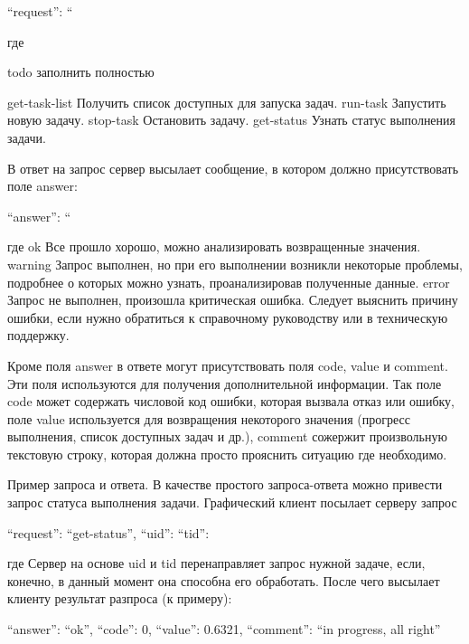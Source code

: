         { “request”: “%
        
где %

todo заполнить полностью

get-task-list
	Получить список доступных для запуска задач.
	run-task
	Запустить новую задачу.
	stop-task
	Остановить задачу.
	get-status
	Узнать статус выполнения задачи.
	
В ответ на запрос сервер высылает сообщение, в котором должно присутствовать поле answer:
	
        { “answer”: “%
        
где %
ok
	Все прошло хорошо, можно анализировать возвращенные значения.
	warning
	Запрос выполнен, но при его выполнении возникли некоторые проблемы, подробнее о которых можно узнать, проанализировав полученные данные.
	error
	Запрос не выполнен, произошла критическая ошибка. Следует выяснить причину ошибки, если нужно обратиться к справочному руководству или в техническую поддержку.
	
	Кроме поля answer в ответе могут присутствовать поля code, value и comment. Эти поля используются для получения дополнительной информации. Так поле code может содержать числовой код ошибки, которая вызвала отказ или ошибку, поле value используется для возвращения некоторого значения (прогресс выполнения, список доступных задач и др.), comment сожержит произвольную текстовую строку, которая должна просто прояснить ситуацию где необходимо.
	
Пример запроса и ответа. В качестве простого запроса-ответа можно привести запрос статуса выполнения задачи. Графический клиент посылает серверу запрос

        {
“request”: “get-status”,
“uid”: %
“tid”: %
}

где %
Сервер на основе uid и tid перенаправляет запрос нужной задаче, если, конечно, в данный момент она способна его обработать. После чего высылает клиенту результат разпроса (к примеру):

        {
                “answer”: “ok”,
                “code”: 0,
                “value”: 0.6321,
                “comment”: “in progress, all right”
}

}}
